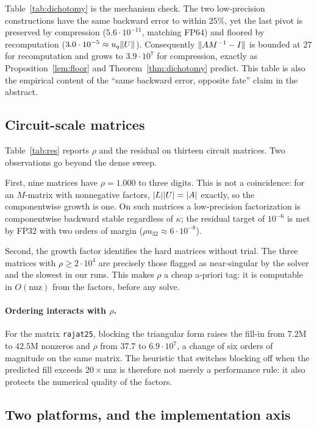Table~\ref{tab:dichotomy} is the mechanism check. The two low-precision
constructions have the same backward error to within $25\%$, yet the last pivot
is preserved by compression ($5.6\cdot10^{-11}$, matching FP64) and floored by
recomputation ($3.0\cdot10^{-5}\approx u_q\lVert U \rVert$). Consequently
$\lVert AM^{-1}-I \rVert$ is bounded at $27$ for recomputation and grows to
$3.9\cdot10^{7}$ for compression, exactly as Proposition~\ref{lem:floor} and
Theorem~\ref{thm:dichotomy} predict. This table is also the empirical content of
the ``same backward error, opposite fate'' claim in the abstract.

\subsection{Circuit-scale matrices}

Table~\ref{tab:res} reports $\rho$ and the residual on thirteen circuit
matrices. Two observations go beyond the dense sweep.

First, nine matrices have $\rho=1.000$ to three digits. This is not a
coincidence: for an $M$-matrix with nonnegative factors, $\lvert L \rvert\lvert U \rvert=\lvert A \rvert$
exactly, so the componentwise growth is one. On such matrices a low-precision
factorization is componentwise backward stable regardless of $\kappa$; the
residual target of $10^{-6}$ is met by FP32 with two orders of margin
($\rho u_{32}\approx6\cdot10^{-8}$).

Second, the growth factor identifies the hard matrices without trial. The three
matrices with $\rho\ge2\cdot10^{4}$ are precisely those flagged as
near-singular by the solver and the slowest in our runs. This makes $\rho$ a
cheap a-priori tag: it is computable in $O(\mathrm{nnz})$ from the factors,
before any solve.

\paragraph{Ordering interacts with $\rho$.}
For the matrix \texttt{rajat25}, blocking the triangular form raises the fill-in
from $7.2$M to $42.5$M nonzeros and $\rho$ from $37.7$ to $6.9\cdot10^{7}$, a
change of six orders of magnitude on the same matrix. The heuristic that
switches blocking off when the predicted fill exceeds $20\times\mathrm{nnz}$ is
therefore not merely a performance rule: it also protects the numerical quality
of the factors.

\subsection{Two platforms, and the implementation axis}

